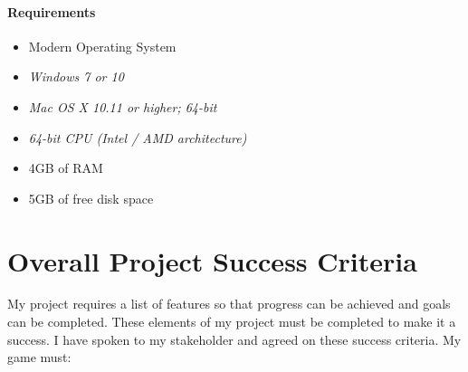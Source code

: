 \documentclass[12pt]{report}
\begin{document}
\small
\paragraph{Requirements}
\begin{itemize}
    \item {Modern Operating System}
    \setlength{\itemindent}{0.5in}
    \item \textit{Windows 7 or 10}
    \item \textit{Mac OS X 10.11 or higher; 64-bit}
    \item \textit{64-bit CPU (Intel / AMD architecture)}
    \setlength{\itemindent}{0in}
    \item 4GB of RAM
    \item 5GB of free disk space
\end{itemize}
\normalsize

\pagebreak

\section{Overall Project Success Criteria}
My project requires a list of features so that progress can be achieved and goals can be completed. These elements of my project must be completed to make it a success. I have spoken to my stakeholder and agreed on these success criteria. My game must:
\end{document}
